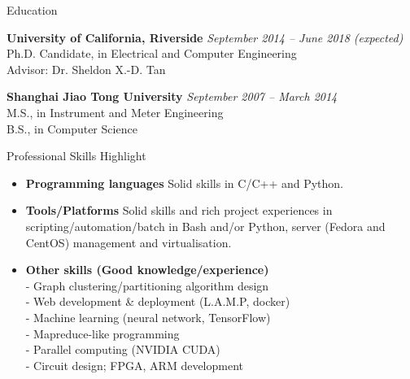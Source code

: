 \documentclass{resume} %
\begin{document}

\begin{rSection}{Education}

{\bf University of California, Riverside} \hfill {\em September 2014 -- June 2018 (expected)} \\
Ph.D. Candidate, in Electrical and Computer Engineering \\
Advisor: Dr. Sheldon X.-D. Tan

{\bf Shanghai Jiao Tong University} \hfill {\em September 2007 -- March 2014} \\
M.S., in Instrument and Meter Engineering\\
B.S., in Computer Science

\end{rSection}

\begin{rSection}{Professional Skills Highlight}

    \begin{itemize}

        \item \textbf{Programming languages} Solid skills in C/C++ and Python.

        \item \textbf{Tools/Platforms} Solid skills and rich project
            experiences in scripting/automation/batch in Bash and/or Python,
            server (Fedora and CentOS) management and virtualisation.

        \item \textbf{Other skills (Good knowledge/experience)}
            \\- Graph clustering/partitioning algorithm design
            \\- Web development \& deployment (L.A.M.P, docker)
            \\- Machine learning (neural network, TensorFlow)
            \\- Mapreduce-like programming
            \\- Parallel computing (NVIDIA CUDA)
            \\- Circuit design; FPGA, ARM development
    \end{itemize}

\end{rSection}

\end{document}
